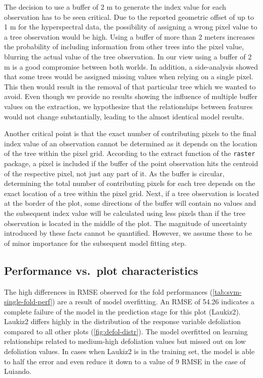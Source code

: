 \documentclass[letterpaper, peerreview]{IEEEtran}
\begin{document}
\noindent The decision to use a buffer of 2 m to generate the index value for each observation has to be seen critical.
Due to the reported geometric offset of up to 1 m for the hyperspectral data, the possibility of assigning a wrong pixel value to a tree observation would be high.
Using a buffer of more than 2 meters increases the probability of including information from other trees into the pixel value, blurring the actual value of the tree observation.
In our view using a buffer of 2 m is a good compromise between both worlds.
In addition, a side-analysis showed that some trees would be assigned missing values when relying on a single pixel.
This then would result in the removal of that particular tree which we wanted to avoid.
Even though we provide no results showing the influence of multiple buffer values on the extraction, we hypothesize that the relationships between features would not change substantially, leading to the almost identical model results.

Another critical point is that the exact number of contributing pixels to the final index value of an observation cannot be determined as it depends on the location of the tree within the pixel grid.
According to the extract function of the \texttt{raster} package, a pixel is included if the buffer of the point observation hits the centroid of the respective pixel, not just any part of it.
As the buffer is circular, determining the total number of contributing pixels for each tree depends on the exact location of a tree within the pixel grid.
Next, if a tree observation is located at the border of the plot, some directions of the buffer will contain no values and the subsequent index value will be calculated using less pixels than if the tree observation is located in the middle of the plot.
The magnitude of uncertainty introduced by these facts cannot be quantified.
However, we assume these to be of minor importance for the subsequent model fitting step.

\subsection{Performance vs.\ plot characteristics}
\label{subsec:perf-plot-char}

\noindent The high differences in RMSE observed for the fold performances (\autoref{tab:svm-single-fold-perf}) are a result of model overfitting.
An RMSE of 54.26 indicates a complete failure of the model in the prediction stage for this plot (Laukiz2).
Laukiz2 differs highly in the distribution of the response variable defoliation compared to all other plots (\autoref{fig:defol-distr}).
The model overfitted on learning relationships related to medium-high defoliation values but missed out on low defoliation values.
In cases when Laukiz2 is in the training set, the model is able to half the error and even reduce it down to a value of 9 RMSE in the case of Luiando.
\end{document}
